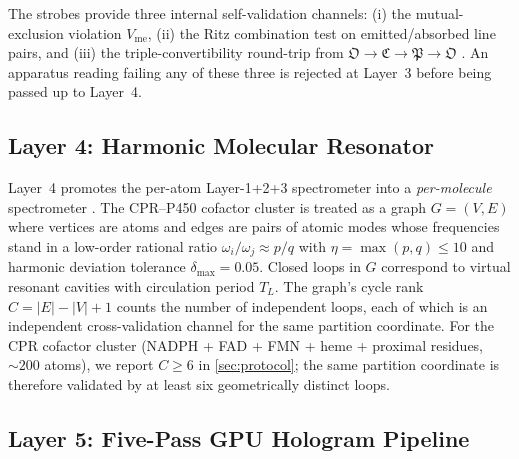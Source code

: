 \documentclass[11pt,twocolumn,a4paper]{article}
\theoremstyle{definition}
\theoremstyle{remark}
\begin{document}
The strobes provide three internal self-validation channels: (i) the
mutual-exclusion violation $V_{\mathrm{me}}$, (ii) the Ritz combination
test on emitted/absorbed line pairs, and (iii) the triple-convertibility
round-trip from $\mathfrak{O} \to \mathfrak{C} \to \mathfrak{P} \to
\mathfrak{O}$ \citep{sachikonye2025_strobes}. An apparatus reading
failing any of these three is rejected at Layer~3 before being passed
up to Layer~4.

\subsection{Layer 4: Harmonic Molecular Resonator}
\label{sec:layer4}

Layer~4 promotes the per-atom Layer-1+2+3 spectrometer into a
\emph{per-molecule} spectrometer \citep{sachikonye2025_hmr}. The CPR--P450
cofactor cluster is treated as a graph $G = (V, E)$ where vertices are
atoms and edges are pairs of atomic modes whose frequencies stand in a
low-order rational ratio $\omega_i / \omega_j \approx p/q$ with
$\eta = \max(p, q) \leq 10$ and harmonic deviation tolerance
$\delta_{\max} = 0.05$. Closed loops in $G$ correspond to virtual resonant
cavities with circulation period $T_L$. The graph's cycle rank
$C = |E| - |V| + 1$ counts the number of independent loops, each of which
is an independent cross-validation channel for the same partition
coordinate. For the CPR cofactor cluster (NADPH + FAD + FMN + heme +
proximal residues, $\sim 200$ atoms), we report $C \geq 6$ in
\cref{sec:protocol}; the same partition coordinate is therefore validated
by at least six geometrically distinct loops.

\subsection{Layer 5: Five-Pass GPU Hologram Pipeline}
\label{sec:layer5}
\end{document}
